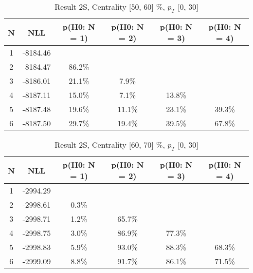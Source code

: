 \begin{table}[htb]
	\begin{center}
	\caption{Result 2S, Centrality [50, 60] \%, $p_{T}$ [0, 30] \GeV
}
{\footnotesize\renewcommand{\arraystretch}{1.4}
		\begin{tabular}{cc||>{\columncolor[gray]{0.8}}cccc}
			N & NLL & p(H0: N = 1) & p(H0: N = 2) & p(H0: N = 3) & p(H0: N = 4)\\ 
		\hline
1 & -8184.46 & & & & \\
2 & -8184.47 & 86.2\% & & & \\
3 & -8186.01 & 21.1\% & 7.9\% & & \\
4 & -8187.11 & 15.0\% & 7.1\% & 13.8\% & \\
5 & -8187.48 & 19.6\% & 11.1\% & 23.1\% & 39.3\% \\
6 & -8187.50 & 29.7\% & 19.4\% & 39.5\% & 67.8\% \\
	\end{tabular}
		\label{tab:lab}
	}
	\end{center}\end{table}

\begin{table}[htb]
	\begin{center}
	\caption{Result 2S, Centrality [60, 70] \%, $p_{T}$ [0, 30] \GeV
}
{\footnotesize\renewcommand{\arraystretch}{1.4}
		\begin{tabular}{cc||c>{\columncolor[gray]{0.8}}ccc}
			N & NLL & p(H0: N = 1) & p(H0: N = 2) & p(H0: N = 3) & p(H0: N = 4)\\ 
		\hline
1 & -2994.29 & & & & \\
2 & -2998.61 & 0.3\% & & & \\
3 & -2998.71 & 1.2\% & 65.7\% & & \\
4 & -2998.75 & 3.0\% & 86.9\% & 77.3\% & \\
5 & -2998.83 & 5.9\% & 93.0\% & 88.3\% & 68.3\% \\
6 & -2999.09 & 8.8\% & 91.7\% & 86.1\% & 71.5\% \\
	\end{tabular}
		\label{tab:lab}
	}
	\end{center}\end{table}

